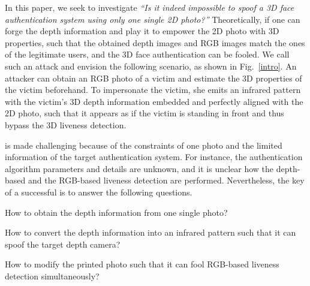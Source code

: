 In this paper, we seek to investigate \emph{``Is it indeed impossible to spoof a 3D face authentication system using only one single 2D photo?''} Theoretically, if one can forge the depth information and play it to empower the 2D photo with 3D properties, such that the obtained depth images and RGB images match the ones of the legitimate users, and the 3D face authentication can be fooled. %
We call such an attack \alias and envision the following scenario, as shown in Fig.~\ref{intro}. An attacker can obtain an RGB photo of a victim and estimate the 3D properties of the victim beforehand. To impersonate the victim, she emits an infrared pattern with the victim's 3D depth information embedded and perfectly aligned with the 2D photo, such that it appears as if the victim is standing in front and thus bypass the 3D liveness detection.



\alias is made challenging because of the constraints of one photo and the limited information of the target authentication system. For instance, the authentication algorithm parameters and details are unknown, and it is unclear how the depth-based and the RGB-based liveness detection are performed. Nevertheless, the key of a successful \alias is to answer the following questions. 
\begin{inparaenum}
\item How to obtain the depth information from one single photo?
\item How to convert the depth information into an infrared pattern such that it can spoof the target depth camera?
\item How to modify the printed photo such that it can fool RGB-based liveness detection simultaneously?
\end{inparaenum}

